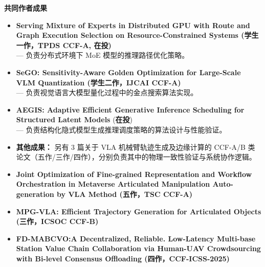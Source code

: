 \documentclass[11pt]{article}
\begin{document}
\textbf{共同作者成果}
\begin{itemize}
    \item \textbf {Serving Mixture of Experts in Distributed GPU with Route and Graph Execution Selection on Resource-Constrained Systems (\textbf{学生一作}，TPDS CCF-A, 在投)}
    \\ \small{--- 负责分布式环境下 MoE 模型的推理路径优化策略。}
    \item \textbf {SeGO: Sensitivity-Aware Golden Optimization for Large-Scale VLM Quantization (\textbf{学生二作}，IJCAI CCF-A)}
    \\ \small{--- 负责视觉语言大模型量化过程中的金点搜索算法实现。}
    \item \textbf{AEGIS: Adaptive Efficient Generative Inference Scheduling for Structured Latent Models} (\textbf{在投})
    \\ \small{--- 负责结构化隐式模型生成推理调度策略的算法设计与性能验证。}
    \item \textbf{其他成果：} 另有 3 篇关于 VLA 机械臂轨迹生成及边缘计算的 CCF-A/B 类论文（五作/三作/四作），分别负责其中的物理一致性验证与系统协作逻辑。
    \item \textbf {Joint Optimization of Fine-grained Representation and Workflow Orchestration in Metaverse Articulated Manipulation Auto-generation by VLA Method (\textbf{五作}，TSC CCF-A)}
    \item \textbf {MPG-VLA: Efficient Trajectory Generation for Articulated Objects (\textbf{三作}，ICSOC CCF-B)}
    \item \textbf {FD-MABCVO:A Decentralized, Reliable. Low-Latency Multi-base Station Value Chain Collaboration via Human-UAV Crowdsourcing with Bi-level Consensus Offloading (\textbf{四作}，CCF-ICSS-2025)}
\end{itemize}


\end{document}

